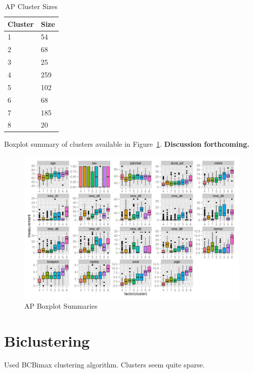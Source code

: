 \documentclass[letterpaper,12pt]{article}
\begin{document}
\begin{table}[h]
  \centering
  \begin{tabular}{l|l}
  Cluster & Size \\
  \hline
  1 & 54 \\
  2 & 68 \\
  3 & 25 \\
  4 & 259 \\
  5 & 102 \\
  6 & 68 \\
  7 & 185 \\
  8 & 20 \\
  \end{tabular}
  \caption{AP Cluster Sizes}
  \label{tab:ap-cluster-sizes}
\end{table}

Boxplot summary of clusters available in Figure~\ref{fig:ap-summaries}.
\textbf{Discussion forthcoming.}

\begin{figure}[h]
  \centering
  \includegraphics[width=\linewidth]{ap-summaries.pdf}
  \caption{AP Boxplot Summaries}
  \label{fig:ap-summaries}
\end{figure}

\section{Biclustering}

Used BCBimax clustering algorithm. Clusters seem quite sparse.
\end{document}
